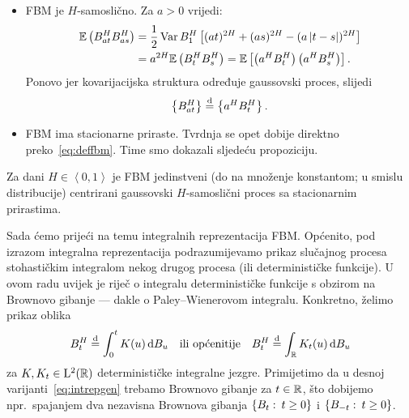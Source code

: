 \documentclass[main.tex]{subfiles}
\begin{document}
\begin{itemize}
	\item FBM je \( H \)-samoslično. Za \( a > 0 \) vrijedi:
	      \begin{align}
		      \mathbb{E} \left( B^H_{at} B^H_{as} \right) & = \frac 12 \operatorname{Var} B^H_1 \left[ (at)^{2H} + (as)^{2H} - (a\left| {t-s} \right|)^{2H} \right] \\
		                                          & = a^{2H}\mathbb{E} \left( B^H_t B^H_s \right)
		      = \mathbb{E} \left[ \left( a^H B^H_t \right)\left( a^HB^H_s \right) \right].
	      \end{align}
	      Ponovo jer kovarijacijska struktura određuje gaussovski proces,
	      slijedi \[ \left\{ B^H_{at} \right\} \stackrel{\mathrm d}{=} \left\{ a^HB^H_t \right\}. \]

	\item FBM ima stacionarne priraste. Tvrdnja se opet dobije direktno preko~\eqref{eq:deffbm}. Time smo dokazali sljedeću propoziciju.
\end{itemize}

\begin{propozicija}\label{prop:fbm}
	Za dani \( H \in \left\langle0,1\right\rangle \) je FBM jedinstveni (do na množenje konstantom; u smislu distribucije) centrirani gaussovski \( H \)-samoslični proces sa stacionarnim prirastima.
\end{propozicija}

Sada ćemo prijeći na temu integralnih reprezentacija FBM. Općenito, pod izrazom
integralna reprezentacija podrazumijevamo prikaz slučajnog procesa stohastičkim
integralom nekog drugog procesa (ili determinističke funkcije). U ovom radu
uvijek je riječ o integralu determinističke funkcije s obzirom na Brownovo gibanje --- dakle
o Paley--Wienerovom integralu. Konkretno, želimo prikaz oblika
\begin{equation}\label{eq:intrepgen}
	B^H_t \stackrel{\mathrm d}{=} \int_0^t K(u) \,\mathrm d B_u \quad \text{ili općenitije} \quad
	B^H_t \stackrel{\mathrm d}{=} \int_{\mathbb{R}} K_t(u) \,\mathrm d B_u
\end{equation}
za \( K, K_t \in \mathrm{L}^2(\mathbb{R}) \) determinističke integralne jezgre. Primijetimo da
u desnoj varijanti~\eqref{eq:intrepgen} trebamo Brownovo gibanje
za \( t \in \mathbb{R} \), što dobijemo npr.\ spajanjem dva nezavisna Brownova gibanja
\( \left\{ B_t \, \colon \, t \ge 0 \right\} \) i \( \left\{ B_{-t} \, \colon \, t \ge 0 \right\} \).
\end{document}
